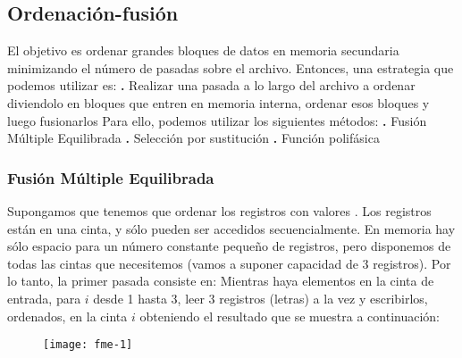 \documentclass[10pt,a4paper]{article}
\begin{document}
\subsection{Ordenación-fusión}

El objetivo es ordenar grandes bloques de datos en memoria secundaria minimizando el número de pasadas sobre el archivo.
\newline
\newline
Entonces, una estrategia que podemos utilizar es:
\newline
\newline
\textbf{.} Realizar una pasada a lo largo del archivo a ordenar diviendolo en bloques que entren en memoria interna, ordenar esos bloques y luego fusionarlos  
\newline
\newline
Para ello, podemos utilizar los siguientes métodos:
\newline
\newline
\textbf{.} Fusión Múltiple Equilibrada
\newline
\newline
\textbf{.} Selección por sustitución
\newline
\newline
\textbf{.} Función polifásica

\subsubsection{Fusión Múltiple Equilibrada}

Supongamos que tenemos que ordenar los registros con valores .
\newline
\newline
Los registros están en una cinta, y sólo pueden ser accedidos secuencialmente.
\newline
\newline
En memoria hay sólo espacio para un número constante pequeño de registros, pero disponemos de todas las cintas que necesitemos (vamos a suponer capacidad de 3 registros).
\newline
\newline
Por lo tanto, la primer pasada consiste en:
\newline
\newline
Mientras haya elementos en la cinta de entrada, para $i$ desde 1 hasta 3, leer 3 registros (letras) a la vez y escribirlos, ordenados, en la cinta $i$ obteniendo el resultado que se muestra a continuación:
\newline
\newline
\begin{figure}[h]
	\centering
\texttt{[image: fme-1]}
	\label{drivers1}
\end{figure}
\newpage
\end{document}
